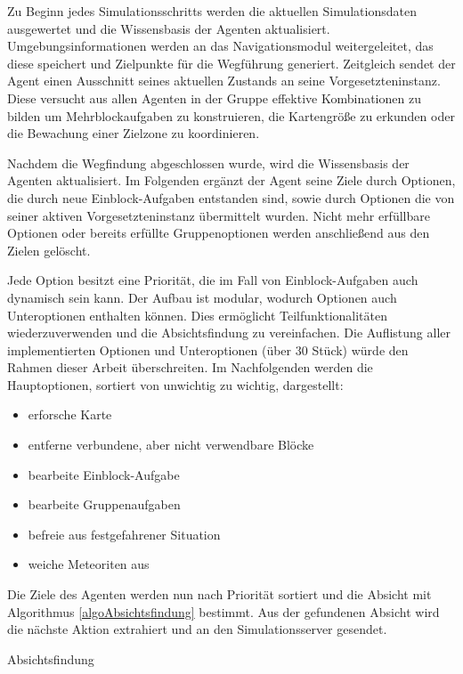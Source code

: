 \documentclass[runningheads]{llncs}
\begin{document}
Zu Beginn jedes Simulationsschritts werden die aktuellen Simulationsdaten ausgewertet und die Wissensbasis der Agenten aktualisiert. Umgebungsinformationen werden an das Navigationsmodul weitergeleitet, das diese speichert und Zielpunkte für die Wegführung generiert. Zeitgleich sendet der Agent einen Ausschnitt seines aktuellen Zustands an seine Vorgesetzteninstanz. Diese versucht aus allen Agenten in der Gruppe effektive Kombinationen zu bilden um Mehrblockaufgaben zu konstruieren, die Kartengröße zu erkunden oder die Bewachung einer Zielzone zu koordinieren.

Nachdem die Wegfindung abgeschlossen wurde, wird die Wissensbasis der Agenten aktualisiert. Im Folgenden ergänzt der Agent seine Ziele durch Optionen, die durch neue Einblock-Aufgaben entstanden sind, sowie durch Optionen die von seiner aktiven Vorgesetzteninstanz übermittelt wurden. Nicht mehr erfüllbare Optionen oder bereits erfüllte Gruppenoptionen werden anschließend aus den Zielen gelöscht.

Jede Option besitzt eine Priorität, die im Fall von Einblock-Aufgaben auch dynamisch sein kann. Der Aufbau ist modular, wodurch Optionen auch Unteroptionen enthalten können. Dies ermöglicht Teilfunktionalitäten wiederzuverwenden und die Absichtsfindung zu vereinfachen. Die Auflistung aller implementierten Optionen und Unteroptionen (über 30 Stück) würde den Rahmen dieser Arbeit überschreiten. Im Nachfolgenden werden die Hauptoptionen, sortiert von unwichtig zu wichtig, dargestellt:

\begin{itemize}
\item erforsche Karte
\item entferne verbundene, aber nicht verwendbare Blöcke
\item bearbeite Einblock-Aufgabe
\item bearbeite Gruppenaufgaben
\item befreie aus festgefahrener Situation
\item weiche Meteoriten aus
\end{itemize}

Die Ziele des Agenten werden nun nach Priorität sortiert und die Absicht mit Algorithmus \ref{algoAbsichtsfindung} bestimmt. Aus der gefundenen Absicht wird die nächste Aktion extrahiert und an den Simulationsserver gesendet.

\begin{algorithm}
\caption{Absichtsfindung}\label{alg:two}
\label{algoAbsichtsfindung}
\end{algorithm}
\end{document}
